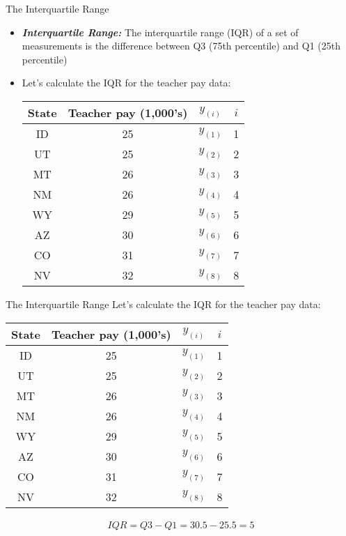 \documentclass[xcolor=dvipsnames]{beamer}
\begin{document}
\begin{frame}{The Interquartile Range}
	\begin{itemize}
		\item \textbf{\emph{Interquartile Range:}} The interquartile range (IQR) of a set of measurements is the difference between Q3 (75th percentile) and Q1 (25th percentile) \pause
		\item Let's calculate the IQR for the teacher pay data:
			\begin{center}
			\begin{tabular}{|c|c|c|c|}
				\hline 
				\textbf{State} & \textbf{Teacher pay (1,000's)} & $y_{(i)}$ & $i$ \\ 
				\hline \hline 
				ID & 25 & $y_{(1)}$& 1 \\  \hline 
				UT &  25  & $y_{(2)}$& 2\\ \hline 
				MT &  26  & $y_{(3)}$& 3\\ \hline 
				NM &  26  & $y_{(4)}$& 4\\ \hline 
				WY &  29  & $y_{(5)}$& 5\\ \hline 
				AZ & 30  & $y_{(6)}$& 6\\ \hline 
				CO &  31 & $y_{(7)}$& 7\\ \hline
				NV & 32  & $y_{(8)}$& 8\\ \hline 
			\end{tabular} 
		\end{center}
	\end{itemize}
\end{frame}

\begin{frame}{The Interquartile Range}
Let's calculate the IQR for the teacher pay data:
		\begin{center}
			\begin{tabular}{|c|c|c|c|}
				\hline 
				\textbf{State} & \textbf{Teacher pay (1,000's)} & $y_{(i)}$ & $i$ \\ 
				\hline \hline 
				ID & 25 & $y_{(1)}$& 1 \\  \hline 
				UT &  25  & $y_{(2)}$& 2\\ \hline 
				MT &  26  & $y_{(3)}$& 3\\ \hline 
				NM &  26  & $y_{(4)}$& 4\\ \hline 
				WY &  29  & $y_{(5)}$& 5\\ \hline 
				AZ & 30  & $y_{(6)}$& 6\\ \hline 
				CO &  31 & $y_{(7)}$& 7\\ \hline
				NV & 32  & $y_{(8)}$& 8\\ \hline 
			\end{tabular} 
		\end{center}
	\begin{gather*}
		IQR = Q3 - Q1 = 30.5 - 25.5 = 5
	\end{gather*}
\end{frame}
\end{document}
